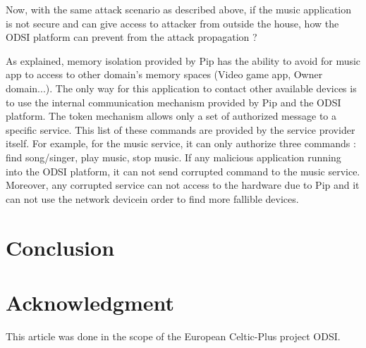\documentclass[conference]{IEEEtran}
\begin{document}
Now, with the same attack scenario as described above, if the music application is not secure and can give access to attacker from outside the house, how the ODSI platform 
can prevent from the attack propagation ? 

As explained, memory isolation provided by Pip has the ability to avoid for music app to access to other domain's memory spaces (Video game app, Owner domain...). The only way for this application to contact other available devices is to use the internal communication mechanism provided by Pip and the ODSI platform. The token mechanism allows only a set of authorized message to a specific service. This list of these commands are provided by the service provider itself. For example, for the music service, it can only authorize three commands : find song/singer, play music, stop music. If any malicious application running into the ODSI platform, it can not send corrupted command to the music service. Moreover, any corrupted service can not access to the hardware due to Pip and it can not use the network devicein order to find more fallible devices. 


\section{Conclusion}





\section*{Acknowledgment}
This article was done in the scope of the European Celtic-Plus project ODSI.  







%
%
%
\end{document}
